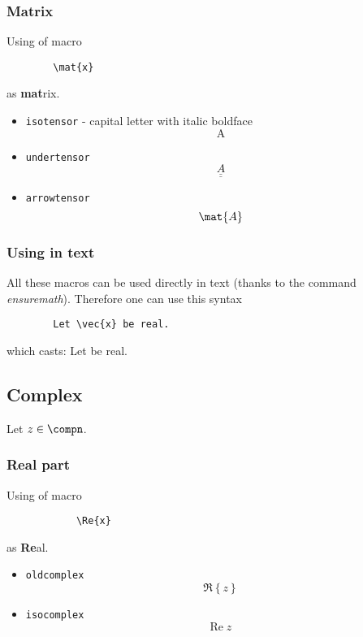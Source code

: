 \documentclass{article}
\begin{document}
		\subsubsection*{Matrix}
		Using of macro
		\begin{lstlisting}
		\mat{x}
		\end{lstlisting}
		as \textbf{mat}rix.
		
		\begin{itemize}
			\item \texttt{isotensor} - capital letter with italic boldface
			\begin{equation*}
				\bm{\mathrm{A}}
			\end{equation*}
			\item \texttt{undertensor}
			\begin{equation*}
				\underline{\underline{A}}
			\end{equation*}
			\item \texttt{arrowtensor}
			\begin{equation*}
				\mat{A}
			\end{equation*}
		\end{itemize}
	
		\subsubsection*{Using in text}
		All these macros can be used directly in text (thanks to the command \textit{ensuremath}). Therefore one can use this syntax
		\begin{lstlisting}
		Let \vec{x} be real.
		\end{lstlisting}
		which casts: Let  be real.
	
	\subsection*{Complex}
		Let $z \in \compn$.
	
		\subsubsection*{Real part}
		Using of macro
		\begin{lstlisting}
			\Re{x}
		\end{lstlisting}
		as \textbf{Re}al.
		
		\begin{itemize}
			\item \texttt{oldcomplex}
			\begin{equation*}
				\Re\left\{z\right\}
			\end{equation*}
			\item \texttt{isocomplex}
			\begin{equation*}
				\mathrm{Re}\; z
			\end{equation*}
		\end{itemize}
	
\end{document}
